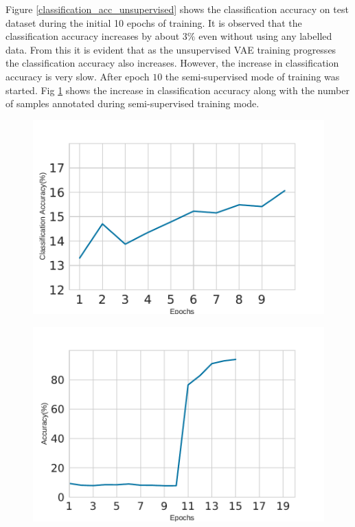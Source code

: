 \documentclass[runningheads]{llncs}
\begin{document}
Figure \ref{classification_acc_unsupervised} shows the  classification accuracy on test dataset during the initial 10 epochs of training.
It is observed that the classification accuracy increases by about $3\%$ even without using any labelled data.
From this it is evident that as the unsupervised VAE training progresses the classification accuracy also increases.
However, the increase in classification accuracy is very slow.
After epoch $10$ the semi-supervised mode of training was started.
Fig \ref{classification_acc_semi_supervised}  shows the increase in classification accuracy along with the number of samples annotated  during semi-supervised training mode.


\begin{figure}
\centering
\begin{minipage}{.5\textwidth}
  \centering
  \includegraphics[width=.9\linewidth]{classification_acc_unsupervised}
  \label{classification_acc_unsupervised}
\end{minipage}%
\begin{minipage}{.5\textwidth}
  \centering
  \includegraphics[width=.9\linewidth]{classification_acc_semi_supervised}
  \label{classification_acc_semi_supervised}
\end{minipage}
\end{figure}
\end{document}
